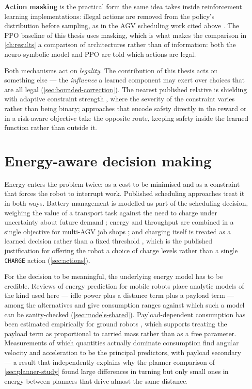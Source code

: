 \textbf{Action masking} is the practical form the same idea takes inside reinforcement learning
implementations: illegal actions are removed from the policy's distribution before sampling, as in
the AGV scheduling work cited above \cite{zhang2025dualresource}. The PPO baseline of this thesis
uses masking, which is what makes the comparison in \cref{ch:results} a comparison of
architectures rather than of information: both the neuro-symbolic model and PPO are told which
actions are legal.

Both mechanisms act on \emph{legality}. The contribution of this thesis acts on something else ---
the \emph{influence} a learned component may exert over choices that are all legal
(\cref{sec:bounded-correction}). The nearest published relative is shielding with adaptive
constraint strength \cite{odriozola2025fearfield}, where the severity of the constraint varies
rather than being binary; approaches that encode safety directly in the reward or in a risk-aware
objective \cite{long2025humanriskaware} take the opposite route, keeping safety inside the learned
function rather than outside it.

\section{Energy-aware decision making}
\label{sec:energy-aware}

Energy enters the problem twice: as a cost to be minimised and as a constraint that forces the
robot to interrupt work. Published scheduling approaches treat it in both ways. Battery management
is modelled as part of the scheduling decision, weighing the value of a transport task against the
need to charge under uncertainty about future demand \cite{dilefeld2025batterymanagement}; energy
and throughput are combined in a single objective for multi-AGV job shops
\cite{cheng2025energysavingfjsp, chang2025hierarchicalagv}; and charging itself is treated as a
learned decision rather than a fixed threshold \cite{zhou2025resilientcharging}, which is the
published justification for offering the robot a choice of charge levels rather than a single
\texttt{CHARGE} action (\cref{sec:actions}).

For the decision to be meaningful, the underlying energy model has to be credible. Reviews of
energy prediction for mobile robots \cite{gora2024energyprediction} place analytic models of the
kind used here --- idle power plus a distance term plus a payload term --- among the alternatives
and give consumption ranges against which such a model can be sanity-checked
(\cref{sec:models-shared}). Payload-dependent consumption has been estimated empirically for ground
robots \cite{mohamadi2024payloadpower}, which supports treating the payload term as proportional to
carried mass rather than as a free parameter. Measurements of which quantities actually dominate
consumption find angular velocity and acceleration to be the principal predictors, with payload
secondary \cite{rico2025explainableenergy} --- a result that independently explains why the
planner comparison of \cref{sec:planner-study} found large differences in turning but only small
ones in energy between planners that drive almost the same distance.


